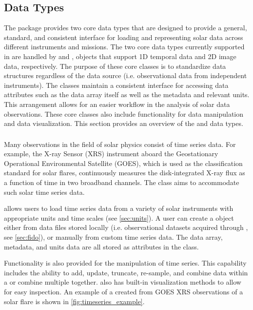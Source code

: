 \subsection{Data Types}
\label{sec:data_types}

The \sunpypkg package provides two core data types that are designed to provide a general, standard, and consistent interface for loading and representing solar data across different instruments and missions.
The two core data types currently supported in \sunpypkg are handled by \Timeseries and \Map, objects that support 1D temporal data and 2D image data, respectively.
The purpose of these core classes is to standardize data structures regardless of the data source (i.e. observational data from independent instruments).
The classes maintain a consistent interface for accessing data attributes such as the data array itself as well as the metadata and relevant units.
This arrangement allows for an easier workflow in the analysis of solar data observations.
These core classes also include functionality for data manipulation and data visualization.
This section provides an overview of the \Timeseries and \Map data types.

\subsubsection{\Timeseries}
\label{sec:timeseries}
Many observations in the field of solar physics consist of time series data.
For example, the X-ray Sensor (XRS) instrument aboard the Geostationary Operational Environmental Satellite (GOES), which is used as the classification standard for solar flares, continuously measures the disk-integrated X-ray flux as a function of time in two broadband channels.
The \Timeseries class aims to accommodate such solar time series data.

\Timeseries allows users to load time series data from a variety of solar instruments with appropriate units and time scales (see \autoref{sec:units}).
 A user can create a \Timeseries object either from data files stored locally (i.e. observational datasets acquired through \Fido, see \autoref{sec:fido}), or manually from custom time series data.
 The data array, metadata, and units data are all stored as attributes in the \Timeseries class.

Functionality is also provided for the manipulation of time series.
This capability includes the ability to add, update, truncate, re-sample, and combine data within a \Timeseries or combine multiple \Timeseries together.
\Timeseries also has built-in visualization methods to allow for easy inspection.
An example of a \Timeseries created from GOES XRS observations of a solar flare is shown in \autoref{fig:timeseries_example}.

